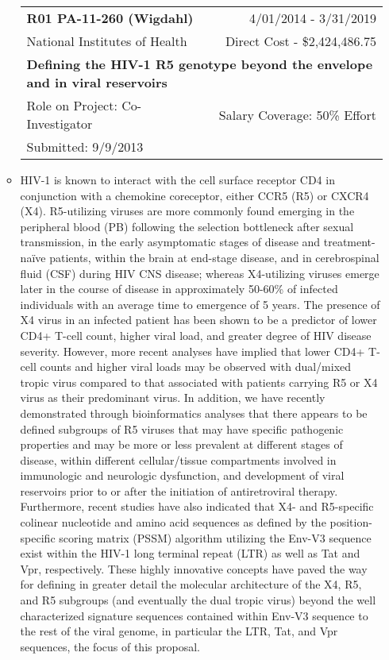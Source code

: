 \documentclass[a4paper,11pt]{article}
\makeatletter
\newenvironment{fullwidth}
    {\par
     \setlength{\@totalleftmargin}{0pt}%
     \setlength{\linewidth}{\hsize}%
     \list{}{\setlength{\leftmargin}{0pt}}
     \item\relax}
    {\endlist}
\makeatother
\begin{document}
\begin{enumerate}
\begin{itemize}
    \begin{longtable}{lr}
    \textbf{R01 PA-11-260 (Wigdahl)} & 4/01/2014 - 3/31/2019 \\
    National Institutes of Health & Direct Cost - \$2,424,486.75 \\
    \multicolumn{2}{p{0.973\textwidth}}{\bfseries Defining the HIV-1 R5 genotype beyond the envelope and in viral reservoirs} \\
    Role on Project:  Co-Investigator & Salary Coverage: 50\% Effort \\
    Submitted: 9/9/2013\\
    \end{longtable}
    \begin{fullwidth}
     HIV-1 is known to interact with the cell surface receptor CD4 in conjunction with a chemokine coreceptor, either CCR5 (R5) or CXCR4 (X4). 
R5-utilizing viruses are more commonly found emerging in the peripheral blood (PB) following the selection bottleneck after sexual transmission, in the early asymptomatic stages of disease and treatment-naïve patients, within the brain at end-stage disease, and in cerebrospinal fluid (CSF) during HIV CNS disease; whereas X4-utilizing viruses emerge later in the course of disease in approximately 50-60\% of infected individuals with an average time to emergence of 5 years. 
The presence of X4 virus in an infected patient has been shown to be a predictor of lower CD4+ T-cell count, higher viral load, and greater degree of HIV disease severity. 
However, more recent analyses have implied that lower CD4+ T-cell counts and higher viral loads may be observed with dual/mixed tropic virus compared to that associated with patients carrying R5 or X4 virus as their predominant virus. 
In addition, we have recently demonstrated through bioinformatics analyses that there appears to be defined subgroups of R5 viruses that may have specific pathogenic properties and may be more or less prevalent at different stages of disease, within different cellular/tissue compartments involved in immunologic and neurologic dysfunction, and development of viral reservoirs prior to or after the initiation of antiretroviral therapy. 
Furthermore, recent studies have also indicated that X4- and R5-specific colinear nucleotide and amino acid sequences as defined by the position-specific scoring matrix (PSSM) algorithm utilizing the Env-V3 sequence exist within the HIV-1 long terminal repeat (LTR) as well as Tat and Vpr, respectively. 
These highly innovative concepts have paved the way for defining in greater detail the molecular architecture of the X4, R5, and R5 subgroups (and eventually the dual tropic virus) beyond the well characterized signature sequences contained within Env-V3 sequence to the rest of the viral genome, in particular the LTR, Tat, and Vpr sequences, the focus of this proposal. 

\end{fullwidth}
\end{itemize}
\end{enumerate}
\end{document}
